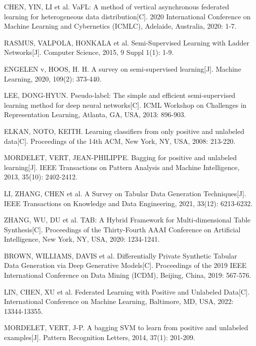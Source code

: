 \begin{thebibliography}{200}
	CHEN, YIN, LI et al. VaFL: A method of vertical asynchronous federated learning for heterogeneous data distribution[C]. 2020 International Conference on Machine Learning and Cybernetics (ICMLC), Adelaide, Australia, 2020: 1-7.

	RASMUS, VALPOLA, HONKALA et al. Semi-Supervised Learning with Ladder Networks[J]. Computer Science, 2015, 9 Suppl 1(1): 1-9.

	ENGELEN v, HOOS, H. H. A survey on semi-supervised learning[J]. Machine Learning, 2020, 109(2): 373-440.

	LEE, DONG-HYUN. Pseudo-label: The simple and efficient semi-supervised learning method for deep neural networks[C]. ICML Workshop on Challenges in Representation Learning, Atlanta, GA, USA, 2013: 896-903.

	ELKAN, NOTO, KEITH. Learning classifiers from only positive and unlabeled data[C]. Proceedings of the 14th ACM, New York, NY, USA, 2008: 213-220.

	MORDELET, VERT, JEAN-PHILIPPE. Bagging for positive and unlabeled learning[J]. IEEE Transactions on Pattern Analysis and Machine Intelligence, 2013, 35(10): 2402-2412.

	LI, ZHANG, CHEN et al. A Survey on Tabular Data Generation Techniques[J]. IEEE Transactions on Knowledge and Data Engineering, 2021, 33(12): 6213-6232.

	ZHANG, WU, DU et al. TAB: A Hybrid Framework for Multi-dimensional Table Synthesis[C]. Proceedings of the Thirty-Fourth AAAI Conference on Artificial Intelligence, New York, NY, USA, 2020: 1234-1241.

	BROWN, WILLIAMS, DAVIS et al. Differentially Private Synthetic Tabular Data Generation via Deep Generative Models[C]. Proceedings of the 2019 IEEE International Conference on Data Mining (ICDM), Beijing, China, 2019: 567-576.

	LIN, CHEN, XU et al. Federated Learning with Positive and Unlabeled Data[C]. International Conference on Machine Learning, Baltimore, MD, USA, 2022: 13344-13355.

	MORDELET, VERT, J-P. A bagging SVM to learn from positive and unlabeled examples[J]. Pattern Recognition Letters, 2014, 37(1): 201-209.


\end{thebibliography}

